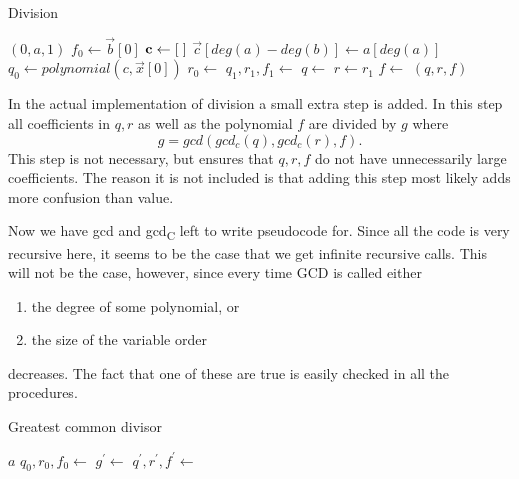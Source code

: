 \begin{algorithm}[H]
  \caption{Division}
  \begin{algorithmic}[1]
        \State \Return $(0,a,1)$
      \EndIf
      \State $f_0\gets \vec{b}[0]$
      \State $\mathbf{c}\gets [\hspace*{1mm}]$
      \State $\vec{c}[deg(a)-deg(b)]\gets a[deg(a)]$
      \State $q_0\gets polynomial(c,\vec{x}[0])$
      \State $r_0\gets$ 
      \State $q_1,r_1,f_1 \gets$ 
      \State $q\gets $ 
      \State $r\gets r_1$
      \State $f\gets$ 
      \State \Return $(q,r,f)$
    \EndProcedure
  \end{algorithmic}
\end{algorithm}
\begin{remark}
  In the actual implementation of division a small extra step is added. In this step all coefficients in $q,r$ as well as the polynomial $f$ are divided by $g$ where
  \begin{equation}
    g = gcd(gcd_c(q),gcd_c(r),f).
  \end{equation}
  This step is not necessary, but ensures that $q,r,f$ do not have unnecessarily large coefficients. The reason it is not included is that adding this step most likely adds more confusion than value.
\end{remark}
Now we have gcd and gcd\textsubscript{C} left to write pseudocode for. Since all the code is very recursive here, it seems to be the case that we get infinite recursive calls. This will not be the case, however, since every time GCD is called either
\begin{enumerate}
  \item the degree of some polynomial, or
  \item the size of the variable order
\end{enumerate}
decreases. The fact that one of these are true is easily checked in all the procedures.
\begin{algorithm}[H]
  \caption{Greatest common divisor}
  \begin{algorithmic}[1]
        \State \Return $a$
      \EndIf
      \State $q_0,r_0,f_0\gets$ 
      \State $g^\prime\gets$ 
      \State $q^\prime,r^\prime,f^\prime\gets$ 
      \State \Return {}
    \EndProcedure
  \end{algorithmic}
\end{algorithm}
